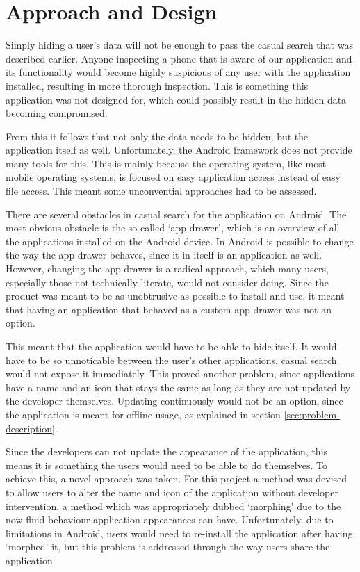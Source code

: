 \section{Approach and Design}
\label{sec:approach-and-design}

Simply hiding a user's data will not be enough to pass the casual search that was described earlier. 
Anyone inspecting a phone that is aware of our application and its functionality would become highly suspicious of any user with the application installed, resulting in more thorough inspection. 
This is something this application was not designed for, which could possibly result in the hidden data becoming compromised. 

From this it follows that not only the data needs to be hidden, but the application itself as well. 
Unfortunately, the Android framework does not provide many tools for this. 
This is mainly because the operating system, like most mobile operating systems, is focused on easy application access instead of easy file access. 
This meant some unconvential approaches had to be assessed.

There are several obstacles in casual search for the application on Android. 
The most obvious obstacle is the so called `app drawer', which is an overview of all the applications installed on the Android device.
In Android is possible to change the way the app drawer behaves, since it in itself is an application as well.
However, changing the app drawer is a radical approach, which many users, especially those not technically literate, would not consider doing.
Since the product was meant to be as unobtrusive as possible to install and use, it meant that having an application that behaved as a custom app drawer was not an option.

This meant that the application would have to be able to hide itself.
It would have to be so unnoticable between the user's other applications, casual search would not expose it immediately. 
This proved another problem, since applications have a name and an icon that stays the same as long as they are not updated by the developer themselves. 
Updating continuously would not be an option, since the application is meant for offline usage, as explained in section \ref{sec:problem-description}. 

Since the developers can not update the appearance of the application, this means it is something the users would need to be able to do themselves.
To achieve this, a novel approach was taken.
For this project a method was devised to allow users to alter the name and icon of the application without developer intervention, a method which was appropriately dubbed `morphing' due to the now fluid behaviour application appearances can have.
Unfortunately, due to limitations in Android, users would need to re-install the application after having `morphed' it, but this problem is addressed through the way users share the application.

